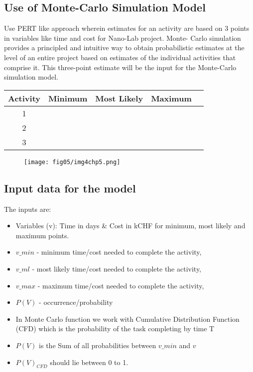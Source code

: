 \subsection{Use of Monte-Carlo Simulation Model}\label{section5.3.1}

Use PERT like approach wherein estimates for an activity are based on 3 points in variables like time and cost for Nano-Lab project. Monte- Carlo simulation provides a principled and intuitive way to obtain probabilistic estimates at the level of an entire project based on estimates of the individual activities that comprise it. This three-point estimate will be the input for the Monte-Carlo simulation model. 

\begin{center}
	\begin{tabular}{ |c|c|c|c| c|} 
		\hline
		Activity & Minimum & Most Likely & Maximum\\
		\hline
		1 & &  & \\ 
			\hline
		2 & & &\\ 
			\hline
		3& & &\\ 
		\hline
	\end{tabular}
\end{center}

\begin{figure}
	\centering
	\texttt{[image: fig05/img4chp5.png]}
\end{figure}

\subsection{Input data for the model} \label{5.3.2}
	
The inputs are:
\begin{itemize}
	\item Variables (v): Time in days \& Cost in kCHF for minimum, most likely and maximum points.
	\item $v\_min$ - minimum time/cost needed to complete the activity,
	\item $v\_ml$ - most likely time/cost needed to complete the activity,
	\item $v\_max$ - maximum time/cost needed to complete the activity, 
	\item $P(V)$ - occurrence/probability
	\item In Monte Carlo function we work with Cumulative Distribution Function (CFD) which is the probability of the task completing by time T
	\item $P(V)$ is the Sum of all probabilities between $v\_min$ and $v$
	\item $P(V)_{CFD}$ should lie between 0 to 1.
\end{itemize}
     
